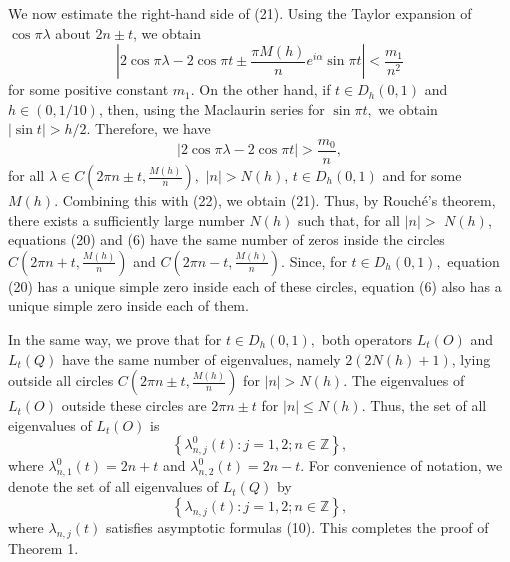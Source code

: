 \documentclass{article}%
\begin{document}
We now estimate the right-hand side of (21). Using the Taylor expansion of
$\cos\pi\lambda$ about $2n\pm t$, we obtain
\[
\left\vert 2\cos\pi\lambda-2\cos\pi t\pm\frac{\pi M(h)}{n}e^{i\alpha}\sin\pi
t\right\vert <\frac{m_{1}}{n^{2}}%
\]
for some positive constant $m_{1}.$ On the other hand, if $t\in D_{h}(0,1)$
and $h\in(0,1/10)$, then, using the Maclaurin series for $\sin\pi t,$ we
obtain $\left\vert \sin t\right\vert >h/2.$ Therefore, we have
\[
\left\vert 2\cos\pi\lambda-2\cos\pi t\right\vert >\frac{m_{0}}{n},
\]
for all $\lambda\in C(2\pi n\pm t,\frac{M(h)}{n}),$ $\left\vert n\right\vert
>N(h)$, $t\in D_{h}(0,1)$ and for some $M(h).$ Combining this with (22), we
obtain (21). Thus, by Rouch\'{e}'s theorem, there exists a sufficiently large
number $N(h)$ such that, for all $\left\vert n\right\vert >$ $N(h)$, equations
(20) and (6) have the same number of zeros inside the circles $C(2\pi
n+t,\frac{M(h)}{n})$ and $C(2\pi n-t,\frac{M(h)}{n}).$ Since, for $t\in
D_{h}(0,1),$ equation (20) has a unique simple zero inside each of these
circles, equation (6) also has a unique simple zero inside each of them.

In the same way, we prove that for $t\in D_{h}(0,1),$ both operators
$L_{t}(O)$ and $L_{t}(Q)$ have the same number of eigenvalues, namely
$2(2N(h)+1)$, lying outside all circles $C(2\pi n\pm t,\frac{M(h)}{n})$ for
$\left\vert n\right\vert >N(h).$ The eigenvalues of $L_{t}(O)$ outside these
circles are $2\pi n\pm t$ for $\left\vert n\right\vert \leq N(h).$ Thus, the
set of all eigenvalues of $L_{t}(O)$ is
\[
\left\{  \lambda_{n,j}^{0}(t):j=1,2;n\in\mathbb{Z}\right\}  ,
\]
where $\lambda_{n,1}^{0}(t)=2n+t$ and $\lambda_{n,2}^{0}(t)=2n-t$. For
convenience of notation, we denote the set of all eigenvalues of $L_{t}(Q)$
by
\[
\left\{  \lambda_{n,j}(t):j=1,2;n\in\mathbb{Z}\right\}  ,
\]
where $\lambda_{n,j}(t)$ satisfies asymptotic formulas (10). This completes
the proof of Theorem 1.
\end{document}
